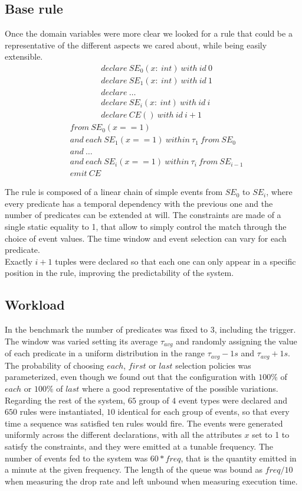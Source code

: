 \subsection{Base rule}
Once the domain variables were more clear we looked for a rule that could be a representative of the different aspects we cared about, while being easily extensible.
\begin{align*}
&declare\ SE_0(x:\ int)\ with\ id\ 0\\
&declare\ SE_1(x:\ int)\ with\ id\ 1\\
&declare\ \ldots\\
&declare\ SE_i(x:\ int)\ with\ id\ i\\
&declare\ CE()\ with\ id\ i+1
\end{align*}
\begin{align*}
&from\ SE_0(x == 1)\\
&and\ each\ SE_1(x == 1)\ within\ \tau_1\ from\ SE_0\\
&and\ \ldots\\
&and\ each\ SE_i(x == 1)\ within\ \tau_i\ from\ SE_{i-1}\\
&emit\ CE
\end{align*}

The rule is composed of a linear chain of simple events from $SE_0$ to $SE_i$, where every predicate has a temporal dependency with the previous one and the number of predicates can be extended at will. The constraints are made of a single static equality to 1, that allow to simply control the match through the choice of event values. The time window and event selection can vary for each predicate.\\
Exactly $i+1$ tuples were declared so that each one can only appear in a specific position in the rule, improving the predictability of the system.

\subsection{Workload}
In the benchmark the number of predicates was fixed to $3$, including the trigger. The window was varied setting its average $\tau_{avg}$ and randomly assigning the value of each predicate in a uniform distribution in the range $\tau_{avg} - 1s$ and $\tau_{avg} + 1s$. The probability of choosing $each$, $first$ or $last$ selection policies was parameterized, even though we found out that the configuration with $100\%$ of $each$ or $100\%$ of $last$ where a good representative of the possible variations.\\
Regarding the rest of the system, $65$ group of $4$ event types were declared and $650$ rules were instantiated, $10$ identical for each group of events, so that every time a sequence was satisfied ten rules would fire. The events were generated uniformly across the different declarations, with all the attributes $x$ set to 1 to satisfy the constraints, and they were emitted at a tunable frequency. The number of events fed to the system was $60 * freq$, that is the quantity emitted in a minute at the given frequency. The length of the queue was bound as $freq / 10$ when measuring the drop rate and left unbound when measuring execution time.

